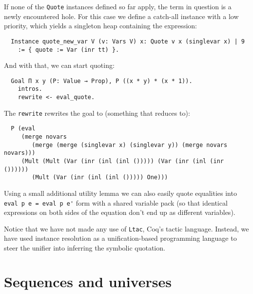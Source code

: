 \documentclass[a4paper,10pt,runningheads]{llncs}
\begin{document}
If none of the \lstinline|Quote| instances defined so far apply, the term in question is a newly encountered hole. For this case we define a catch-all instance with a low priority, which yields a singleton heap containing the expression:
\begin{lstlisting}
  Instance quote_new_var V (v: Vars V) x: Quote v x (singlevar x) | 9
    := { quote := Var (inr tt) }.
\end{lstlisting}
And with that, we can start quoting:
\begin{lstlisting}
  Goal Π x y (P: Value → Prop), P ((x * y) * (x * 1)).
    intros.
    rewrite <- eval_quote.
\end{lstlisting}
The \lstinline|rewrite| rewrites the goal to (something that reduces to):
\begin{lstlisting}
  P (eval
     (merge novars
        (merge (merge (singlevar x) (singlevar y)) (merge novars novars)))
     (Mult (Mult (Var (inr (inl (inl ())))) (Var (inr (inl (inr ())))))
        (Mult (Var (inr (inl (inl ())))) One)))
\end{lstlisting}

Using a small additional utility lemma we can also easily quote equalities into \lstinline|eval p e = eval p e'| form with a shared variable pack (so that identical expressions on both sides of the equation don't end up as different variables).

Notice that we have not made any use of \lstinline|Ltac|, Coq's tactic language. Instead, we have used instance resolution as a unification-based programming language to steer the unifier into inferring the symbolic quotation.




\section{Sequences and universes}\label{sequences}
\end{document}
